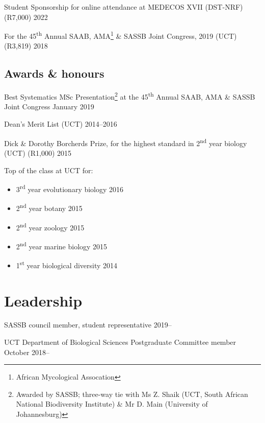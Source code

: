 \documentclass[10pt]{article}
\begin{document}
Student Sponsorship for online attendance at MEDECOS XVII (DST-NRF) (R7,000)
                                                            \hfill 2022

For the 45\textsuperscript{th} Annual SAAB, AMA\footnote{African Mycological
Assocation} \& SASSB Joint Congress, 2019 (UCT) (R3,819)    \hfil 2018

\subsection*{Awards \& honours}

Best Systematics MSc Presentation\footnote{Awarded by SASSB; three-way tie with 
Ms Z. Shaik (UCT, South African National Biodiversity Institute) \& Mr D. Main
(University of Johannesburg)} at the 45\textsuperscript{th} Annual SAAB, AMA \&
SASSB Joint Congress                                \hfill January 2019

Dean's Merit List (UCT)                               \hfill 2014--2016

Dick \& Dorothy Borcherds Prize, for the highest standard in 
2\textsuperscript{nd} year biology (UCT) (R1,000)           \hfill 2015

Top of the class at UCT for:

\begin{itemize}[noitemsep, nolistsep]
  \item 3\textsuperscript{rd} year evolutionary biology              \hfill 2016
  \item 2\textsuperscript{nd} year botany                            \hfill 2015
  \item 2\textsuperscript{nd} year zoology                           \hfill 2015
  \item 2\textsuperscript{nd} year marine biology                    \hfill 2015
  \item 1\textsuperscript{st} year biological diversity              \hfill 2014
\end{itemize}

\section*{Leadership} %

SASSB council member, student representative              \hfill 2019--

UCT Department of Biological Sciences Postgraduate Committee member
                                                      \hfill October 2018--
\end{document}
